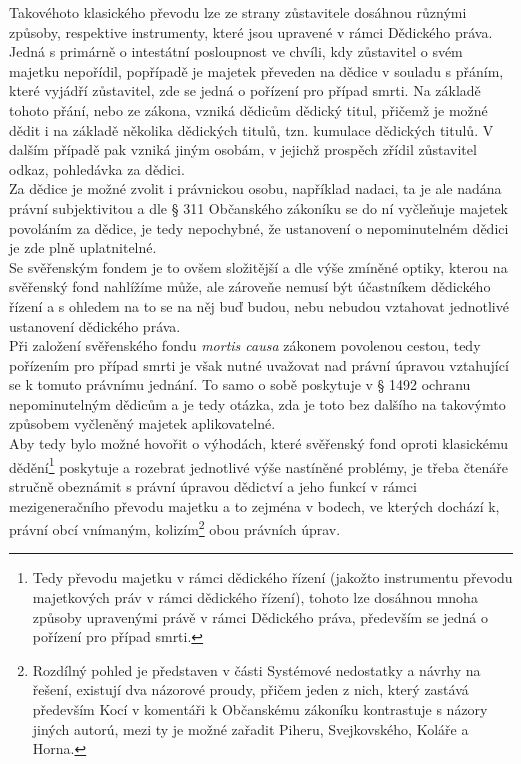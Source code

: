 \documentclass{article}
\begin{document}
Takovéhoto klasického převodu lze ze strany zůstavitele dosáhnou různými způsoby, respektive instrumenty, které jsou upravené v rámci Dědického práva. Jedná s primárně o intestátní posloupnost ve chvíli, kdy zůstavitel o svém majetku nepořídil, popřípadě je majetek převeden na dědice v souladu s přáním, které vyjádří zůstavitel, zde se jedná o pořízení pro případ smrti. Na základě tohoto přání, nebo ze zákona, vzniká dědicům dědický titul, přičemž je možné dědit i na základě několika dědických titulů, tzn. kumulace dědických titulů. V dalším případě pak vzniká jiným osobám, v jejichž prospěch zřídil zůstavitel odkaz, pohledávka za dědici.\\

Za dědice je možné zvolit i právnickou osobu, například nadaci, ta je ale nadána právní subjektivitou a dle § 311 Občanského zákoníku se do ní vyčleňuje majetek povoláním za dědice, je tedy nepochybné, že ustanovení o nepominutelném dědici je zde plně uplatnitelné.\\

Se svěřenským fondem je to ovšem složitější a dle výše zmíněné optiky, kterou na svěřenský fond nahlížíme může, ale zároveňe nemusí být účastníkem dědického řízení a s ohledem na to se na něj buď budou, nebu nebudou vztahovat jednotlivé ustanovení dědického práva.\\

Při založení svěřenského fondu \textit{mortis causa} zákonem povolenou cestou, tedy pořízením pro případ smrti je však nutné uvažovat nad právní úpravou vztahující se k tomuto právnímu jednání. To samo o sobě poskytuje v § 1492 ochranu nepominutelným dědicům a je tedy otázka, zda je toto bez dalšího na takovýmto způsobem vyčleněný majetek aplikovatelné.\\



Aby tedy bylo možné hovořit o výhodách, které svěřenský fond oproti klasickému dědění\footnote{Tedy převodu majetku v rámci dědického řízení (jakožto instrumentu převodu majetkových práv v rámci dědického řízení), tohoto lze dosáhnou mnoha způsoby upravenými právě v rámci Dědického práva, především se jedná o pořízení pro případ smrti.} poskytuje a rozebrat jednotlivé výše nastíněné problémy, je třeba čtenáře stručně obeznámit s právní úpravou dědictví a jeho funkcí v rámci mezigeneračního převodu majetku a to zejména v bodech, ve kterých dochází k, právní obcí vnímaným, kolizím\footnote{Rozdílný pohled je představen v části Systémové nedostatky a návrhy na řešení, existují dva názorové proudy, přičem jeden z nich, který zastává především Kocí v komentáři k Občanskému zákoníku kontrastuje s názory jiných autorú, mezi ty je možné zařadit Piheru, Svejkovského, Koláře a Horna.} obou právních úprav.\\
\end{document}
